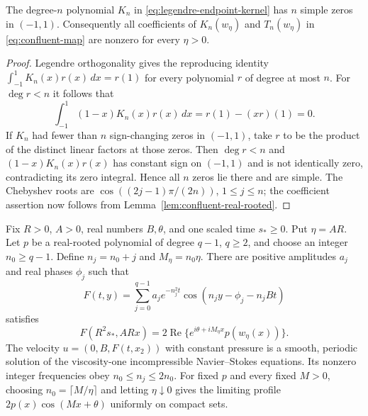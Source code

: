 \begin{lemma}
\label{lem:kernel-real-rooted}
The degree-$n$ polynomial $K_n$ in
\eqref{eq:legendre-endpoint-kernel} has $n$ simple zeros in $(-1,1)$.
Consequently all coefficients of $K_n(w_\eta)$ and $T_n(w_\eta)$ in
\eqref{eq:confluent-map} are nonzero for every $\eta>0$.
\end{lemma}

\begin{proof}
Legendre orthogonality gives the reproducing identity
$\int_{-1}^1K_n(x)r(x)\,dx=r(1)$ for every polynomial $r$ of degree
at most $n$. For $\deg r<n$ it follows that
\[
 \int_{-1}^1(1-x)K_n(x)r(x)\,dx=r(1)-(xr)(1)=0.
\]
If $K_n$ had fewer than $n$ sign-changing zeros in $(-1,1)$, take $r$
to be the product of the distinct linear factors at those zeros. Then
$\deg r<n$ and $(1-x)K_n(x)r(x)$ has constant sign on $(-1,1)$ and
is not identically zero, contradicting its zero integral. Hence all $n$
zeros lie there and are simple. The Chebyshev roots are
$\cos((2j-1)\pi/(2n))$, $1\le j\le n$; the coefficient assertion
now follows from Lemma~\ref{lem:confluent-real-rooted}.
\end{proof}

\begin{theorem}
\label{thm:integer-slice}
Fix $R>0$, $A>0$, real numbers $B,\theta$, and one scaled time $s_*\ge0$.
Put $\eta=AR$. Let $p$ be a real-rooted polynomial of degree $q-1$,
$q\ge2$, and choose an integer $n_0\ge q-1$. Define
$n_j=n_0+j$ and $M_\eta=n_0\eta$.
There are positive amplitudes $a_j$ and real phases $\phi_j$ such that
\begin{equation}\label{eq:integer-shear-packet}
 F(t,y)=\sum_{j=0}^{q-1}a_je^{-n_j^2t}
 \cos(n_jy-\phi_j-n_jBt)
\end{equation}
satisfies
\begin{equation}\label{eq:integer-slice-identity}
 F(R^2s_*,ARx)
 =2\operatorname{Re}\{e^{i\theta+iM_\eta x}p(w_\eta(x))\}.
\end{equation}
The velocity $u=(0,B,F(t,x_2))$ with constant pressure is a smooth,
periodic solution of the viscosity-one incompressible Navier--Stokes
equations. Its nonzero integer frequencies obey
$n_0\le n_j\le2n_0$. For fixed $p$ and every fixed $M>0$, choosing
$n_0=\lceil M/\eta\rceil$ and letting $\eta\downarrow0$ gives the
limiting profile $2p(x)\cos(Mx+\theta)$ uniformly on compact sets.
\end{theorem}


